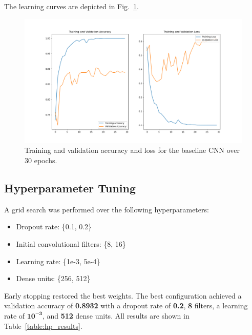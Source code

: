 \documentclass[conference]{IEEEtran}
\begin{document}
The learning curves are depicted in Fig.~\ref{fig:baseline_curves}.

\begin{figure}[htbp]
	\centerline{\includegraphics[width=\linewidth]{Images/baseline_curves.png}}
	\caption{Training and validation accuracy and loss for the baseline CNN over 30 epochs.}
	\label{fig:baseline_curves}
\end{figure}

\subsection{Hyperparameter Tuning}
A grid search was performed over the following hyperparameters:
\begin{itemize}
	\item Dropout rate: \{0.1, 0.2\}
	\item Initial convolutional filters: \{8, 16\}
	\item Learning rate: \{1e-3, 5e-4\}
	\item Dense units: \{256, 512\}
\end{itemize}
\vspace{0.5cm}

Early stopping restored the best weights. The best configuration achieved a validation accuracy of \textbf{0.8932} with a dropout rate of \textbf{0.2}, \textbf{8} filters, a learning rate of \(\mathbf{10^{-3}}\), and \textbf{512} dense units. All results are shown in Table~\ref{table:hp_results}.
\end{document}
